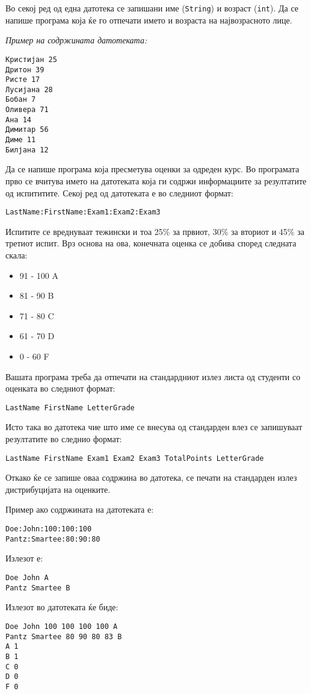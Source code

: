 \begin{questions}
\question
Во секој ред од една датотека се запишани име (\texttt{String}) и возраст
(\texttt{int}). Да се напише програма која ќе го отпечати името и возраста на
највозрасното лице.

\emph{Пример на содржината датотеката:}

\begin{verbatim}
Кристијан 25
Дритон 39
Ристе 17
Лусијана 28
Бобан 7
Оливера 71
Ана 14
Димитар 56
Диме 11
Билјана 12
\end{verbatim}



\question

Да се напише програма која пресметува оценки за одреден курс. Во програмата прво
се вчитува името на датотеката која ги содржи информациите за резултатите од
испититите. Секој ред од датотеката е во следниот формат:

\begin{verbatim}
LastName:FirstName:Exam1:Exam2:Exam3
\end{verbatim}

Испитите се вреднуваат тежински и тоа 25\% за првиот, 30\% за вториот и 45\% за
третиот испит. Врз основа на ова, конечната оценка се добива според следната
скала: 
\begin{itemize}
  \item 91 - 100 A
  \item 81 - 90 B
  \item 71 - 80 C
  \item 61 - 70 D
  \item 0 - 60 F
\end{itemize}
Вашата програма треба да отпечати на стандардниот излез листа од студенти со
оценката во следниот формат:
\begin{verbatim}
LastName FirstName LetterGrade
\end{verbatim}

Исто така во датотека чие што име се внесува од стандарден влез се запишуваат
резултатите во следнио формат:

\begin{verbatim}
LastName FirstName Exam1 Exam2 Exam3 TotalPoints LetterGrade
\end{verbatim}
Откако ќе се запише оваа содржина во датотека, се печати на стандарден излез
дистрибуцијата на оценките.

Пример ако содржината на датотеката е:
\begin{verbatim}
Doe:John:100:100:100
Pantz:Smartee:80:90:80
\end{verbatim}
Излезот е:
\begin{verbatim}
Doe John A
Pantz Smartee B
\end{verbatim}
Излезот во датотеката ќе биде:
\begin{verbatim}
Doe John 100 100 100 100 A
Pantz Smartee 80 90 80 83 B
A 1
B 1
C 0
D 0
F 0
\end{verbatim}


\end{questions}
